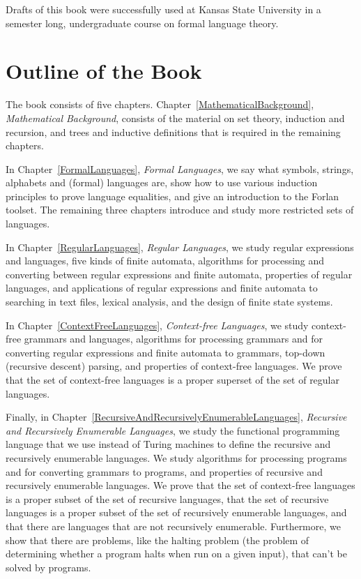 Drafts of this book were successfully used at Kansas State University
in a semester long, undergraduate course on formal language theory.

\section*{Outline of the Book}
\label{OutlineOfTheBook}

The book consists of five chapters.
Chapter~\ref{MathematicalBackground}, \emph{Mathematical Background},
consists of the material on set theory, induction and recursion, and
trees and inductive definitions that is required in the remaining
chapters.

In Chapter~\ref{FormalLanguages}, \emph{Formal Languages},
we say what symbols, strings, alphabets and (formal) languages are,
show how to use various induction principles to prove language
equalities, and give an introduction to the Forlan toolset.  The
remaining three chapters introduce and study more restricted sets of
languages.

In Chapter~\ref{RegularLanguages}, \emph{Regular Languages}, we study
regular expressions and languages, five kinds of finite automata,
algorithms for processing and converting between regular expressions
and finite automata, properties of regular languages, and applications
of regular expressions and finite automata to searching in text files,
lexical analysis, and the design of finite state systems.

In Chapter~\ref{ContextFreeLanguages}, \emph{Context-free Languages},
we study context-free grammars and languages, algorithms for
processing grammars and for converting regular expressions and finite
automata to grammars, top-down (recursive descent) parsing, and
properties of context-free languages.  We prove that the set of context-free
languages is a proper superset of the set of regular languages.

Finally, in Chapter~\ref{RecursiveAndRecursivelyEnumerableLanguages},
\emph{Recursive and Recursively Enumerable Languages}, we study the
functional programming language that we use instead of Turing machines
to define the recursive and recursively enumerable languages.  We
study algorithms for processing programs and for converting grammars
to programs, and properties of recursive and recursively enumerable
languages.  We prove that the set of context-free languages is a
proper subset of the set of recursive languages, that the set of
recursive languages is a proper subset of the set of recursively
enumerable languages, and that there are languages that are not
recursively enumerable.  Furthermore, we show that there are problems,
like the halting problem (the problem of determining whether a program
halts when run on a given input), that can't be solved by programs.

